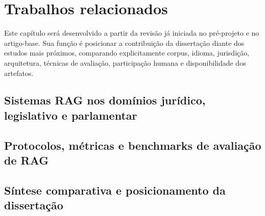 \section{Trabalhos relacionados}

Este capítulo será desenvolvido a partir da revisão já iniciada no pré-projeto e no artigo-base. Sua função é posicionar a contribuição da dissertação diante dos estudos mais próximos, comparando explicitamente corpus, idioma, jurisdição, arquitetura, técnicas de avaliação, participação humana e disponibilidade dos artefatos.

\subsection{Sistemas RAG nos domínios jurídico, legislativo e parlamentar}


\subsection{Protocolos, métricas e benchmarks de avaliação de RAG}


\subsection{Síntese comparativa e posicionamento da dissertação}

